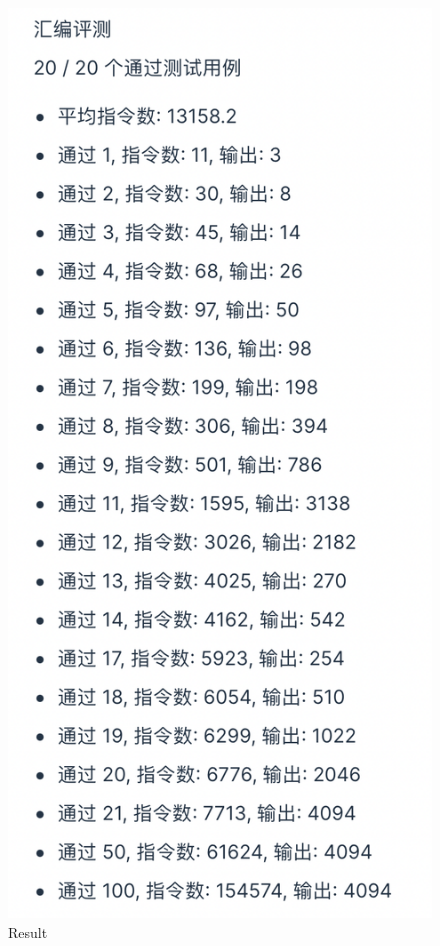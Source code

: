 \documentclass[UTF8]{ctexart}
\begin{document}
\begin{figure}[h]
        \centering
        \includegraphics[scale=0.5]{result.png}
        \caption{Result}
\end{figure}
\end{document}
